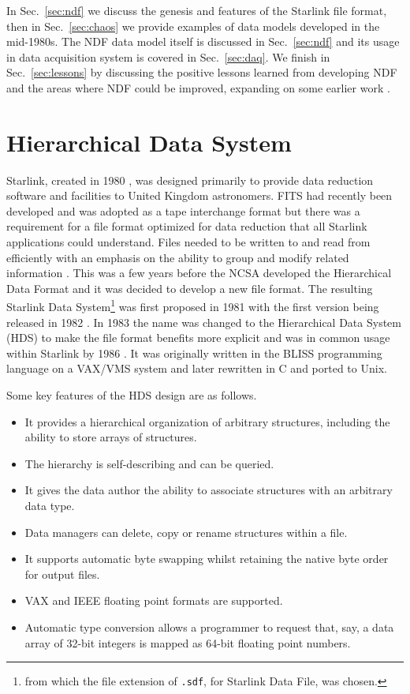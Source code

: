 \documentclass[final,authoryear,5p,times,twocolumn]{elsarticle}
\begin{document}
In Sec.\ \ref{sec:ndf} we discuss the genesis and features of the Starlink
file format, then in Sec.\ \ref{sec:chaos} we provide examples of data
models developed in the mid-1980s. The NDF data model itself is
discussed in Sec.\ \ref{sec:ndf} and its usage in data acquisition
system is covered in Sec.\ \ref{sec:daq}. We finish in Sec.\
\ref{sec:lessons} by discussing the positive lessons learned from
developing NDF and the areas where NDF could be improved, expanding on
some earlier work \citep{P91_adassxxiii}.

\section{Hierarchical Data System}
\label{sec:hds}

Starlink, created in 1980
\citep{1980IrAJ...14..197E,1982MmSAI..53...55T}, was designed
primarily to provide data reduction software and facilities to United
Kingdom astronomers. FITS
\citep{1979ipia.coll..445W,1981A&AS...44..363W} had recently been
developed and was adopted as a tape interchange format but there was a
requirement for a file format optimized for data reduction that all
Starlink applications could understand. Files
needed to be written to and read from efficiently with an emphasis on the
ability to group and modify related information
\citep{1981STARENT4}. This was a few years before the NCSA developed
the Hierarchical Data Format \citep{HDF1,Folk2010} and it was decided
to develop a new file format. The resulting Starlink Data
System\footnote{from which the file extension of \texttt{.sdf}, for
  Starlink Data File, was chosen.} was first proposed in 1981 with the
first version being released in 1982 \citep[see
e.g.][]{1982QJRAS..23..485D,1991STARB...8....2L}. In 1983 the name was
changed to the Hierarchical Data System (HDS) to make the file format
benefits more explicit and was in common usage within Starlink by 1986
\citep{1986BICDS..30...13L}. It was originally written in the BLISS
programming language on a VAX/VMS system and later rewritten in C and
ported to Unix.

Some key features of the HDS design are as follows.
\begin{itemize}
\item It provides a hierarchical organization of arbitrary structures, including the
  ability to store arrays of structures.
\item The hierarchy is self-describing and can be queried.
\item It gives the data author the ability to associate structures with an arbitrary data type.
\item Data managers can delete, copy or rename structures within a file.
\item It supports automatic byte swapping whilst retaining the native byte order
  for output files.
\item VAX and IEEE floating point formats are supported.
\item Automatic type conversion allows a programmer to request that,
  say, a data array of 32-bit integers is mapped as 64-bit floating
  point numbers.
\end{itemize}
\end{document}

